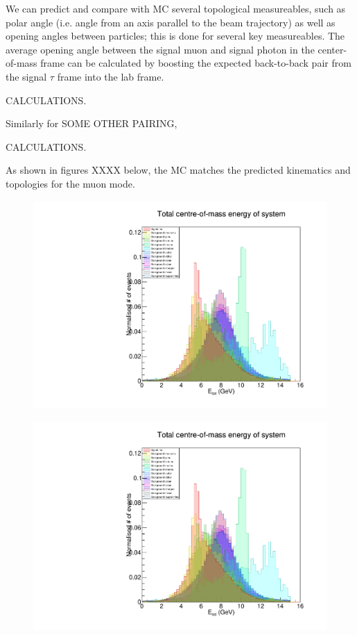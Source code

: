 \documentclass[12pt]{thesis}  %
\begin{document}
We can predict and compare with MC several topological measureables, such as polar angle (i.e. angle from an axis parallel to the beam trajectory) as well as opening angles between particles; this is done for several key measureables. The average opening angle between the signal muon and signal photon in the center-of-mass frame can be calculated by boosting the expected back-to-back pair from the signal $\tau$ frame into the lab frame.

CALCULATIONS.

Similarly for SOME OTHER PAIRING,

CALCULATIONS.

As shown in figures XXXX below, the MC matches the predicted kinematics and topologies for the muon mode.


\begin{figure}[h]
\centering
\begin{minipage}{.5\textwidth}
  \centering
  \includegraphics[width=\linewidth]{images/stack/stack_cut6_totalCM_E.pdf}
  \label{fig:test1}
\end{minipage}%
\begin{minipage}{.5\textwidth}
  \centering
  \includegraphics[width=\linewidth]{images/stack/stack_cut6_totalCM_E.pdf}
  \label{fig:test2}
\end{minipage}
\end{figure}
\end{document}
